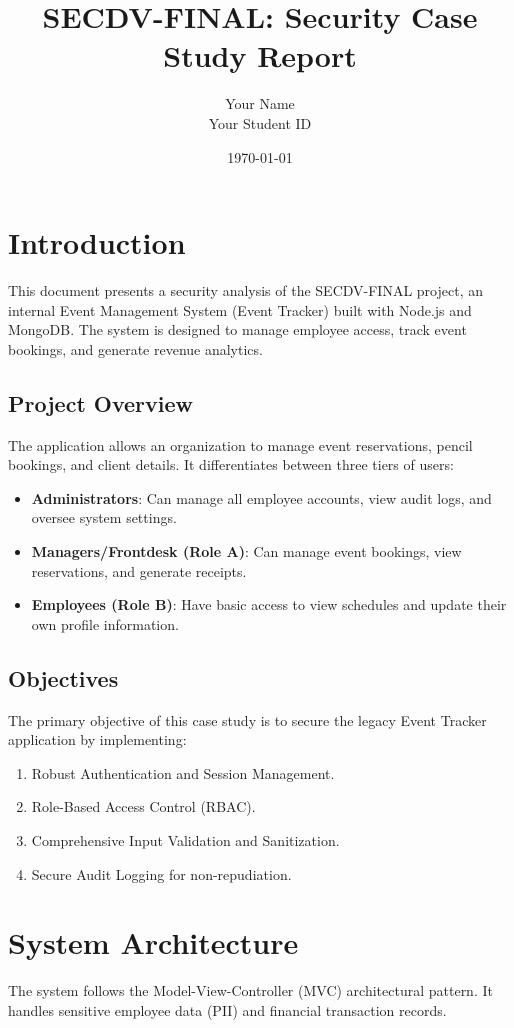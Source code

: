 \documentclass[11pt]{article}
\title{SECDV-FINAL: Security Case Study Report}
\author{Your Name \\ Your Student ID}
\date{\today}
\begin{document}
\maketitle
\tableofcontents
\clearpage

\section{Introduction}
This document presents a security analysis of the SECDV-FINAL project, an internal Event Management System (Event Tracker) built with Node.js and MongoDB. The system is designed to manage employee access, track event bookings, and generate revenue analytics.

\subsection{Project Overview}
The application allows an organization to manage event reservations, pencil bookings, and client details. It differentiates between three tiers of users:
\begin{itemize}
    \item \textbf{Administrators}: Can manage all employee accounts, view audit logs, and oversee system settings.
    \item \textbf{Managers/Frontdesk (Role A)}: Can manage event bookings, view reservations, and generate receipts.
    \item \textbf{Employees (Role B)}: Have basic access to view schedules and update their own profile information.
\end{itemize}

\subsection{Objectives}
The primary objective of this case study is to secure the legacy Event Tracker application by implementing:
\begin{enumerate}
    \item Robust Authentication and Session Management.
    \item Role-Based Access Control (RBAC).
    \item Comprehensive Input Validation and Sanitization.
    \item Secure Audit Logging for non-repudiation.
\end{enumerate}

\section{System Architecture}
The system follows the Model-View-Controller (MVC) architectural pattern. It handles sensitive employee data (PII) and financial transaction records.
\end{document}
